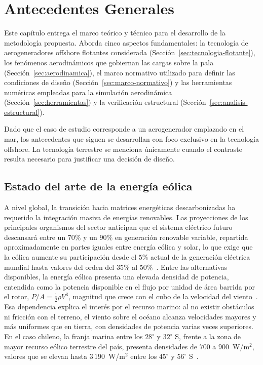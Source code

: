 \chapter{Antecedentes Generales}

Este capítulo entrega el marco teórico y técnico para el desarrollo de la metodología propuesta. Aborda cinco aspectos fundamentales: la tecnología de aerogeneradores offshore flotantes considerada (Sección~\ref{sec:tecnologia-flotante}), los fenómenos aerodinámicos que gobiernan las cargas sobre la pala (Sección~\ref{sec:aerodinamica}), el marco normativo utilizado para definir las condiciones de diseño (Sección~\ref{sec:marco-normativo}) y las herramientas numéricas empleadas para la simulación aerodinámica (Sección~\ref{sec:herramientas}) y la verificación estructural (Sección~\ref{sec:analisis-estructural}).

Dado que el caso de estudio corresponde a un aerogenerador emplazado en el mar, los antecedentes que siguen se desarrollan con foco exclusivo en la tecnología offshore. La tecnología terrestre se menciona únicamente cuando el contraste resulta necesario para justificar una decisión de diseño.

\section{Estado del arte de la energía eólica}

A nivel global, la transición hacia matrices energéticas descarbonizadas ha requerido la integración masiva de energías renovables. Las proyecciones de los principales organismos del sector anticipan que el sistema eléctrico futuro descansará entre un $70\%$ y un $90\%$ en generación renovable variable, repartida aproximadamente en partes iguales entre energía eólica y solar, lo que exige que la eólica aumente su participación desde el $5\%$ actual de la generación eléctrica mundial hasta valores del orden del $35\%$ al $50\%$~\parencite{Veers2022}. Entre las alternativas disponibles, la energía eólica presenta una elevada densidad de potencia, entendida como la potencia disponible en el flujo por unidad de área barrida por el rotor, $P/A = \tfrac{1}{2}\rho V^3$, magnitud que crece con el cubo de la velocidad del viento~\parencite{Paraschivoiu2002}. Esa dependencia explica el interés por el recurso marino: al no existir obstáculos ni fricción con el terreno, el viento sobre el océano alcanza velocidades mayores y más uniformes que en tierra, con densidades de potencia varias veces superiores. En el caso chileno, la franja marina entre los $28^\circ$ y $32^\circ$ S, frente a la zona de mayor recurso eólico terrestre del país, presenta densidades de $700$ a $900$~W/m$^2$, valores que se elevan hasta $3\,190$~W/m$^2$ entre los $45^\circ$ y $56^\circ$ S~\parencite{Mattar2017}.

